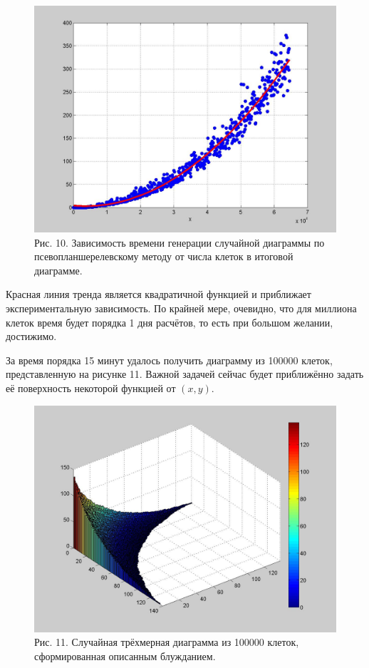 \documentclass[12pt]{report}
\begin{document}
\begin{figure}[!ht]
\begin{center}
\includegraphics[scale=0.4]{AssymptHooksTime}
\\Рис. 10. Зависимость времени генерации случайной диаграммы по псевопланшерелевскому методу от числа клеток в итоговой диаграмме.
\end{center}
\end{figure}

Красная линия тренда является квадратичной функцией и приближает экспериментальную зависимость. По крайней мере, очевидно, что для миллиона клеток время будет порядка 1 дня расчётов, то есть при большом желании, достижимо.

За время порядка 15 минут удалось получить диаграмму из 100000 клеток, представленную на рисунке 11. Важной задачей сейчас будет приближённо задать её поверхность некоторой функцией от $(x,y)$.

\begin{figure}[!ht]
\begin{center}
\includegraphics[scale=0.4]{3DHooks100000}
\\Рис. 11. Случайная трёхмерная диаграмма из 100000 клеток, сформированная описанным блужданием.
\end{center}
\end{figure}
\end{document}
